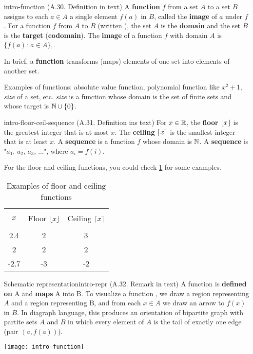\documentclass[../src/handouts/main.tex]{subfiles}
\begin{document}
\begin{definition}{}{intro-function}
  (A.30. Definition in text)
  A \textbf{function} $f$ from a set $A$ to a set $B$ assigns to each $a \in A$ a single element $f(a)$ in $B$, called the \textbf{image} of $a$ under $f$.
  For a function $f$ from $A$ to $B$ (written ), the set $A$ is the \textbf{domain} and the set $B$ is the \textbf{target} (\textbf{codomain}). The \textbf{image} of a function $f$ with domain $A$ is $\{ f(a):\, a \in A \},$.
\end{definition}

In brief, a \textbf{function} transforms (maps) elements of one set into elements of another set.

Examples of functions: absolute value function, polynomial function like $x^2 + 1$, \textit{size} of a set, etc. \textit{size} is a function whose domain is the set of finite sets and whose target is $\mathbb{N} \cup \{0\}$.

\begin{definition}{}{intro-floor-ceil-sequence}
  (A.31. Definition ins text)
  For $x \in \mathbb{R}$, the \textbf{floor} $\lfloor x\rfloor$ is the greatest integer that is at most $x$.
  The \textbf{ceiling} $\lceil x\rceil$ is the smallest integer that is at least $x$.
  A \textbf{sequence} is a function $f$ whose domain is $\mathbb{N}$.
  A \textbf{sequence} is "$a_1,\, a_2,\, a_3,\, \ldots$", where $a_i = f(i)$.
\end{definition}

For the floor and ceiling functions, you could check \cref{table:intro-ex-floor-ceil} for some examples.

\begin{table}[ht]
  \def \gap {\\[-0.5em]}
  \centering
  \begin{tabular}{ccc}
    \hline \gap
    $x$  & Floor $\lfloor x\rfloor$ & Ceiling $\lceil x\rceil$ \gap \\ \hline
    2.4  & 2                 & 3                       \\
    2    & 2                 & 2                       \\
    -2.7 & -3                & -2                      \\ \hline
  \end{tabular}
  \caption{Examples of floor and ceiling functions}
  \label{table:intro-ex-floor-ceil}
\end{table}

\begin{remark}{Schematic representation}{intro-repr}
  (A.32. Remark in text)
  A function  is \textbf{defined on} A and \textbf{maps} A into B.
  To visualize a function , we draw a region representing $A$ and a region representing B, and from each $x \in A$ we draw an arrow to $f(x)$ in $B$.
  In diagraph language, this produces an orientation of bipartite graph with partite sets $A$ and $B$ in which every element of $A$ is the tail of exactly one edge (pair $(a, f(a))$).

  \centering
  \texttt{[image: intro-function]}
\end{remark}
\end{document}

